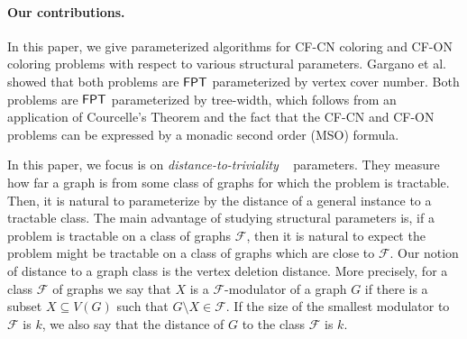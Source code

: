 \documentclass[svgnames]{llncs}
\newcommand{\fpt}{\ensuremath{\sf{FPT}}\xspace}
\newcommand{\cfcn}{\textsc {CF-CN}}
\newcommand{\cfon}{\textsc {CF-ON}}
\begin{document}
\paragraph{ Our contributions.} 
In this paper, we give parameterized algorithms for \cfcn{} coloring and \cfon{} coloring problems with respect to various structural parameters. Gargano et al.\cite{gargano2015complexity} showed that both problems are $\fpt$ parameterized by vertex cover number. Both problems are $\fpt$ parameterized by tree-width, which follows from an application of Courcelle's Theorem \cite{courcelle1990monadic} and the fact that the \cfcn{} and \cfon{} problems can be expressed by a monadic second order (MSO) formula. 

In this paper, we focus is on \emph{distance-to-triviality} ~\cite{guo2004structural,cai2003parameterized} parameters. They measure how far a graph is from some class of graphs for which the problem is tractable.
Then, it is natural to parameterize by the distance of a general instance to a tractable class.
The main advantage of studying structural parameters is, if a problem is tractable on a class of graphs $\mathcal{F}$, 
then it is natural to expect the problem might be tractable on a class of graphs which are close to $\mathcal{F}$.  
Our notion of distance to a graph class is the vertex deletion distance. More precisely, for a class $\mathcal{F}$ of graphs we say that $X$ is a $\mathcal{F}$-modulator of a graph $G$ if there is a  subset $X\subseteq V(G)$ such that  $G \setminus X \in \mathcal{F}$. If the size of the smallest modulator to $\mathcal{F}$ is $k$, we also say that the distance of $G$ to the class $\mathcal{F}$ is $k$. 
\end{document}
